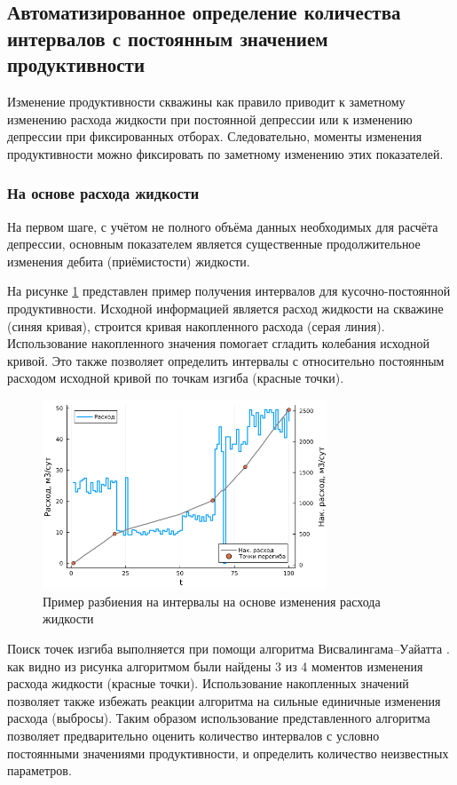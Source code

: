 \documentclass[14pt]{article}
\begin{document}
\subsection{Автоматизированное определение количества интервалов с постоянным значением продуктивности}
Изменение продуктивности скважины как правило приводит к заметному изменению расхода жидкости при постоянной депрессии или к изменению депрессии при фиксированных отборах. Следовательно, моменты изменения продуктивности можно фиксировать по заметному изменению этих показателей. 

\subsubsection{На основе расхода жидкости}
На первом шаге, с учётом не полного объёма данных необходимых для расчёта депрессии, основным показателем является  существенные продолжительное изменения дебита (приёмистости) жидкости.

 На рисунке \ref{fig:VisvalingamWhyatt_examp} представлен пример получения интервалов для кусочно-постоянной продуктивности. Исходной информацией является расход жидкости на скважине (синяя кривая), строится кривая накопленного расхода (серая линия). Использование накопленного значения помогает сгладить колебания исходной кривой. Это также позволяет определить интервалы с относительно постоянным расходом исходной кривой по точкам изгиба (красные точки).
 \begin{figure}[!htb]
	\centering
	\includegraphics[width=20pc]{pic/VisvalingamWhyatt}
	\caption{Пример разбиения на интервалы на основе изменения расхода жидкости}
	\label{fig:VisvalingamWhyatt_examp}
\end{figure}
Поиск точек изгиба выполняется при помощи алгоритма Висвалингама–Уайатта \cite{VisWhy}. как видно из рисунка алгоритмом были найдены 3 из 4 моментов изменения расхода жидкости (красные точки). Использование накопленных значений позволяет также избежать реакции алгоритма на сильные единичные изменения расхода (выбросы). Таким образом использование представленного алгоритма позволяет предварительно оценить количество  интервалов с условно постоянными значениями продуктивности, и определить количество неизвестных параметров.
\end{document}
